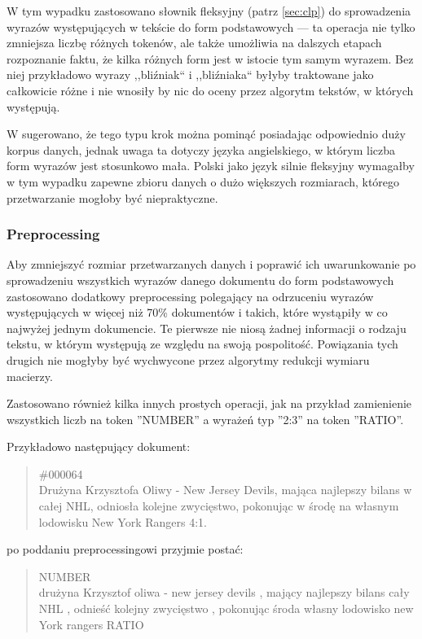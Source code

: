 \documentclass[11pt,a4paper]{article}
\begin{document}
W tym wypadku zastosowano słownik fleksyjny (patrz \ref{sec:clp}) do
sprowadzenia wyrazów występujących w tekście do form podstawowych --- ta
operacja nie tylko zmniejsza liczbę różnych tokenów, ale także umożliwia na
dalszych etapach rozpoznanie faktu, że kilka różnych form jest w istocie tym
samym wyrazem. Bez niej przykładowo wyrazy ,,bliźniak`` i ,,bliźniaka`` byłyby
traktowane jako całkowicie różne i nie wnosiły by nic do oceny przez algorytm
tekstów, w których występują.

W \cite{manning-schuetze} sugerowano, że tego typu krok można pominąć
posiadając odpowiednio duży korpus danych, jednak uwaga ta dotyczy języka
angielskiego, w którym liczba form wyrazów jest stosunkowo mała. Polski jako
język silnie fleksyjny wymagałby w tym wypadku zapewne zbioru danych o dużo
większych rozmiarach, którego przetwarzanie mogłoby być niepraktyczne.

\subsubsection{Preprocessing}

Aby zmniejszyć rozmiar przetwarzanych danych i poprawić ich uwarunkowanie po
sprowadzeniu wszystkich wyrazów danego dokumentu do form podstawowych
zastosowano dodatkowy preprocessing polegający na odrzuceniu wyrazów
występujących w więcej niż 70\% dokumentów i takich, które wystąpiły w co
najwyżej jednym dokumencie. Te pierwsze nie niosą żadnej informacji o rodzaju
tekstu, w którym występują ze względu na swoją pospolitość. Powiązania tych
drugich nie mogłyby być wychwycone przez algorytmy redukcji wymiaru macierzy.

Zastosowano również kilka innych prostych operacji, jak na przykład
zamienienie wszystkich liczb na token ''NUMBER'' a wyrażeń typ ''2:3''
na token ''RATIO''.

Przykładowo następujący dokument:

\begin{quote}
\#000064\\
Drużyna Krzysztofa Oliwy - New Jersey Devils, mająca najlepszy
bilans w całej NHL, odniosła kolejne zwycięstwo, pokonując w
środę na własnym lodowisku New York Rangers 4:1.
\end{quote}

po poddaniu preprocessingowi przyjmie postać:

\begin{quote}
NUMBER\\
drużyna Krzysztof oliwa - new jersey devils , mający najlepszy bilans
cały NHL , odnieść kolejny zwycięstwo , pokonując środa własny lodowisko new
York rangers RATIO
\end{quote}
\end{document}
